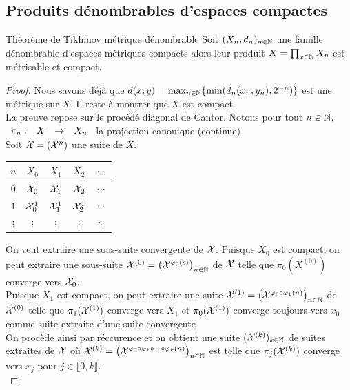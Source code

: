 \documentclass[]{report}
\begin{document}
    \subsection*{Produits dénombrables d'espaces compactes}

    \begin{tm}{Théorème de Tikhinov métrique dénombrable}{}
        Soit $(X_n,d_n)_{n\in \mathbb{N}}$ une famille dénombrable d'espaces métriques compacts alors leur produit $X=\prod_{x\in \mathbb{N}}X_n$ est métrisable et compact.
    \end{tm}

    \begin{proof}
        Nous savons déjà que $d(x,y)=\max_{{n\in\mathbb{N}}}\{\min(d_n(x_n,y_n),2^{-n})\}$ est une métrique sur $X$. Il reste à montrer que $X$ est compact.\\
        La preuve repose sur le procédé diagonal de Cantor. Notons pour tout ${n\in\mathbb{N}}$, $\begin{array}{ccccc} \pi_n : & X & \to & X_n \end{array}$ la projection canonique (continue)\\
        Soit $\mathcal{X}=(\mathcal{X}^n)$ une suite de $X$.\\
        \begin{center}
            \begin{tabular}{c|cccc}
                $n$&$X_0$&$X_1$&$X_2$&$\cdots$\\ \hline
                $0$&$\mathcal{X}_0$&$\mathcal{X}_1$&$\mathcal{X}_2$&$\cdots$\\
                $1$&$\mathcal{X}_0^1$&$\mathcal{X}_1^1$&$\mathcal{X}_2^1$&$\cdots$\\
                $\vdots$&$\vdots$&$\vdots$&$\vdots$&$\ddots$
            \end{tabular}
        \end{center}
        On veut extraire une sous-suite convergente de $\mathcal{X}$. Puisque $X_0$ est compact, on peut extraire une sous-suite $\mathcal{X}^{(0)}=\left(\mathcal{X}^{\varphi_0(c)}\right)_{n\in\mathbb{N}}$ de $\mathcal{X}$ telle que $\pi_0(X^{(0)})$ converge vers $\mathcal{X}_0$.\\
        Puisque $X_1$ est compact, on peut extraire une suite $\mathcal{X}^{(1)}=\left( \mathcal{X}^{\varphi_0\circ\varphi_1(n)}\right)_{n\in\mathbb{N}}$ de $\mathcal{X}^{(0)}$ telle que $\pi_1(\mathcal{X}^{(1)})$ converge vers $X_1$ et $\pi_0(\mathcal{X}^{(1)})$ converge toujours vers $x_0$ comme suite extraite d'une suite convergente.\\
        On procède ainsi par réccurence et on obtient une suite $(\mathcal{X}^{(k)})_{k\in \mathbb{N}}$ de suites extraites de $\mathcal{X}$ où $\mathcal{X}^{(k)}=\left( \mathcal{X}^{\varphi_0\circ\varphi_1\circ\cdots\circ \varphi_k(n)}\right)_{n\in\mathbb{N}}$ est telle que $\pi_j(\mathcal{X}^{(k)})$ converge vers $x_j$ pour $j\in\llbracket 0,k\rrbracket$.\\

\end{proof}
\end{document}

